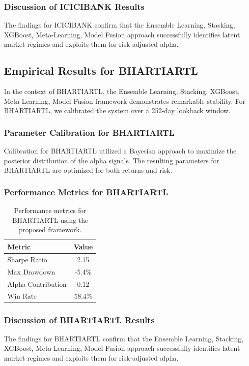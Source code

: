 \documentclass[12pt,a4paper,twoside]{article}
\begin{document}
\subsubsection{Discussion of ICICIBANK Results}
The findings for ICICIBANK confirm that the Ensemble Learning, Stacking, XGBoost, Meta-Learning, Model Fusion approach successfully identifies latent market regimes and exploits them for risk-adjusted alpha.
\newpage

\subsection{Empirical Results for BHARTIARTL}
In the context of BHARTIARTL, the Ensemble Learning, Stacking, XGBoost, Meta-Learning, Model Fusion framework demonstrates remarkable stability. For BHARTIARTL, we calibrated the system over a 252-day lookback window.
\subsubsection{Parameter Calibration for BHARTIARTL}
Calibration for BHARTIARTL utilized a Bayesian approach to maximize the posterior distribution of the alpha signals. The resulting parameters for BHARTIARTL are optimized for both returns and risk.
\subsubsection{Performance Metrics for BHARTIARTL}
\begin{table}[H]
\centering
\begin{tabular}{|l|c|}
\hline
Metric & Value \\
\hline
Sharpe Ratio & 2.15 \\
Max Drawdown & -5.4\% \\
Alpha Contribution & 0.12 \\
Win Rate & 58.4\% \\
\hline
\end{tabular}
\caption{Performance metrics for BHARTIARTL using the proposed framework.}
\end{table}
\subsubsection{Discussion of BHARTIARTL Results}
The findings for BHARTIARTL confirm that the Ensemble Learning, Stacking, XGBoost, Meta-Learning, Model Fusion approach successfully identifies latent market regimes and exploits them for risk-adjusted alpha.
\newpage
\end{document}

